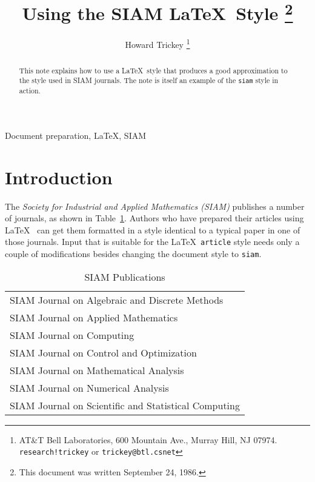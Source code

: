 \title{Using the SIAM \LaTeX\ Style%
	\thanks{This document was written September 24, 1986.}}
\author{Howard Trickey%
	\thanks{AT\&T Bell Laboratories, 600 Mountain Ave.,
		Murray Hill, NJ 07974.
		{\tt research!trickey} or {\tt trickey@btl.csnet}}}

\maketitle
\begin{abstract}
This note explains how to use a \LaTeX\ style that produces a good
approximation to the style used in SIAM journals.
The note is itself an example of the {\tt siam} style in action.
\end{abstract}
\begin{keywords}
Document preparation, \LaTeX, SIAM
\end{keywords}

\section{Introduction}
The {\em Society for Industrial and Applied Mathematics (SIAM)\/}
publishes a number of journals, as shown in Table~\ref{pub-table}.
Authors who have prepared their articles using \LaTeX\ \cite{latexbook}
can get them formatted in a style identical to a typical paper
in one of those journals.
Input that is suitable for the \LaTeX\ {\tt article} style needs
only a couple of modifications besides changing the document style
to {\tt siam}.

\begin{table}\label{pub-table}
\caption{SIAM Publications}
\begin{center}
\begin{tabular}{l}
\hline
SIAM Journal on Algebraic and Discrete Methods\\
SIAM Journal on Applied Mathematics\\
SIAM Journal on Computing\\
SIAM Journal on Control and Optimization\\
SIAM Journal on Mathematical Analysis\\
SIAM Journal on Numerical Analysis\\
SIAM Journal on Scientific and Statistical Computing\\
\hline
\end{tabular}
\end{center}
\end{table}

